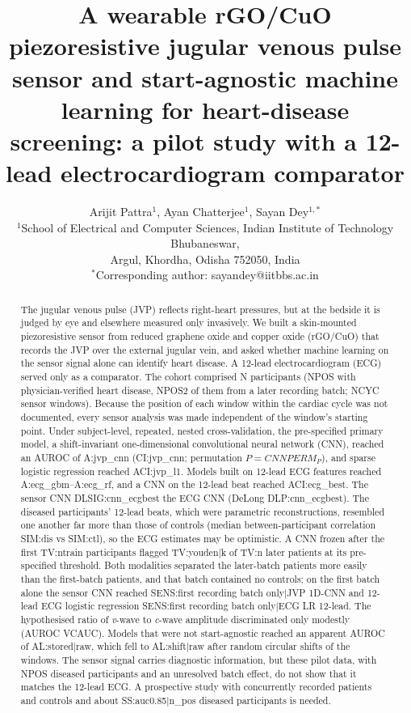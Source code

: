\documentclass[11pt]{article}
\title{\textbf{A wearable rGO/CuO piezoresistive jugular venous pulse sensor and start-agnostic machine learning for heart-disease screening: a pilot study with a 12-lead electrocardiogram comparator}}
\author{Arijit Pattra$^{1}$, Ayan Chatterjee$^{1}$, Sayan Dey$^{1,*}$\\[4pt]
\small $^{1}$School of Electrical and Computer Sciences, Indian Institute of Technology Bhubaneswar,\\ \small Argul, Khordha, Odisha 752050, India\\
\small $^{*}$Corresponding author: sayandey@iitbbs.ac.in}
\date{}
\begin{document}
\maketitle


\begin{abstract}
\noindent The jugular venous pulse (JVP) reflects right-heart pressures, but at the bedside it is judged by eye and elsewhere measured only invasively. We built a skin-mounted piezoresistive sensor from reduced graphene oxide and copper oxide (rGO/CuO) that records the JVP over the external jugular vein, and asked whether machine learning on the sensor signal alone can identify heart disease. A 12-lead electrocardiogram (ECG) served only as a comparator. The cohort comprised {{N}} participants ({{NPOS}} with physician-verified heart disease, {{NPOS2}} of them from a later recording batch; {{NCYC}} sensor windows). Because the position of each window within the cardiac cycle was not documented, every sensor analysis was made independent of the window's starting point. Under subject-level, repeated, nested cross-validation, the pre-specified primary model, a shift-invariant one-dimensional convolutional neural network (CNN), reached an AUROC of {{A:jvp_cnn}} ({{CI:jvp_cnn}}; permutation $P={{CNNPERM_P}}$), and sparse logistic regression reached {{ACI:jvp_l1}}. Models built on 12-lead ECG features reached {{A:ecg_gbm}}--{{A:ecg_rf}}, and a CNN on the 12-lead beat reached {{ACI:ecg_best}}. The sensor CNN {{DLSIG:cnn_ecgbest}} the ECG CNN (DeLong {{DLP:cnn_ecgbest}}). The diseased participants' 12-lead beats, which were parametric reconstructions, resembled one another far more than those of controls (median between-participant correlation {{SIM:dis}} vs {{SIM:ctl}}), so the ECG estimates may be optimistic. A CNN frozen after the first {{TV:ntrain}} participants flagged {{TV:youden|k}} of {{TV:n}} later patients at its pre-specified threshold. Both modalities separated the later-batch patients more easily than the first-batch patients, and that batch contained no controls; on the first batch alone the sensor CNN reached {{SENS:first recording batch only|JVP 1D-CNN}} and 12-lead ECG logistic regression {{SENS:first recording batch only|ECG LR 12-lead}}. The hypothesised ratio of \textit{v}-wave to \textit{c}-wave amplitude discriminated only modestly (AUROC {{VCAUC}}). Models that were not start-agnostic reached an apparent AUROC of {{AL:stored|raw}}, which fell to {{AL:shift|raw}} after random circular shifts of the windows. The sensor signal carries diagnostic information, but these pilot data, with {{NPOS}} diseased participants and an unresolved batch effect, do not show that it matches the 12-lead ECG. A prospective study with concurrently recorded patients and controls and about {{SS:auc0.85|n_pos}} diseased participants is needed.
\end{abstract}
\end{document}
